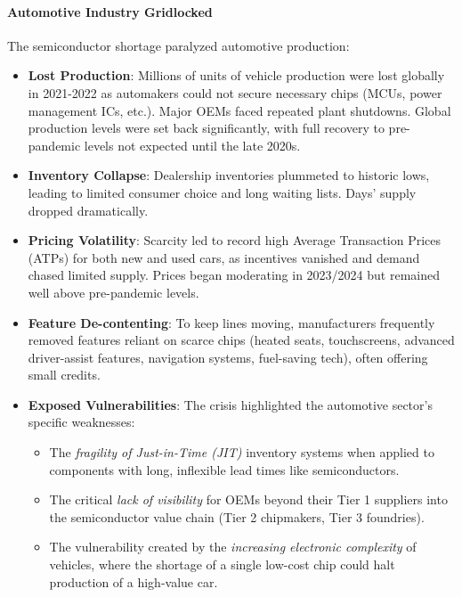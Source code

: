 \paragraph{Automotive Industry Gridlocked}
The semiconductor shortage paralyzed automotive production:
\begin{itemize}
    \item \textbf{Lost Production}: Millions of units of vehicle production were lost globally in 2021-2022 as automakers could not secure necessary chips (MCUs, power management ICs, etc.). Major OEMs faced repeated plant shutdowns. Global production levels were set back significantly, with full recovery to pre-pandemic levels not expected until the late 2020s.
    \item \textbf{Inventory Collapse}: Dealership inventories plummeted to historic lows, leading to limited consumer choice and long waiting lists. Days' supply dropped dramatically.
    \item \textbf{Pricing Volatility}: Scarcity led to record high Average Transaction Prices (ATPs) for both new and used cars, as incentives vanished and demand chased limited supply. Prices began moderating in 2023/2024 but remained well above pre-pandemic levels.
    \item \textbf{Feature De-contenting}: To keep lines moving, manufacturers frequently removed features reliant on scarce chips (heated seats, touchscreens, advanced driver-assist features, navigation systems, fuel-saving tech), often offering small credits.
    \item \textbf{Exposed Vulnerabilities}: The crisis highlighted the automotive sector's specific weaknesses:
          \begin{itemize}
              \item The \textit{fragility of Just-in-Time (JIT)} inventory systems when applied to components with long, inflexible lead times like semiconductors.
              \item The critical \textit{lack of visibility} for OEMs beyond their Tier 1 suppliers into the semiconductor value chain (Tier 2 chipmakers, Tier 3 foundries).
              \item The vulnerability created by the \textit{increasing electronic complexity} of vehicles, where the shortage of a single low-cost chip could halt production of a high-value car.
          \end{itemize}
\end{itemize}

